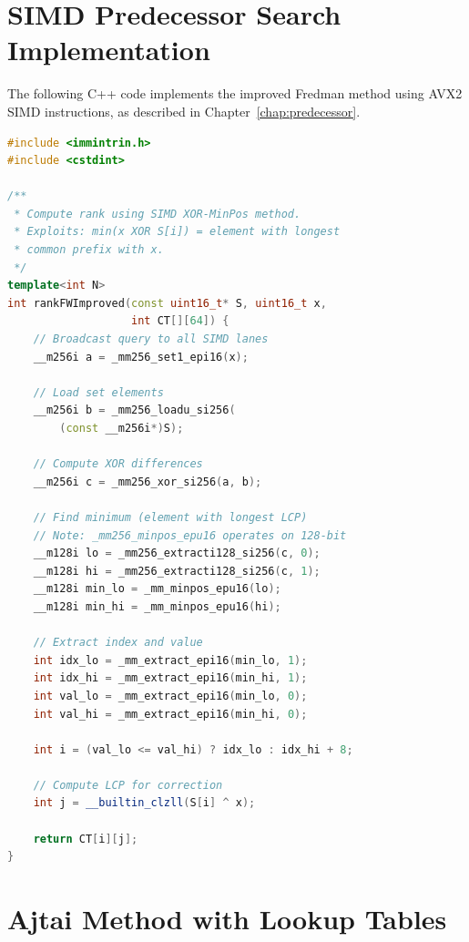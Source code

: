 \section{SIMD Predecessor Search Implementation}
\label{sec:simd-code}

The following C++ code implements the improved Fredman method using AVX2 SIMD instructions, as described in Chapter~\ref{chap:predecessor}.

\begin{lstlisting}[language=C++, caption={Improved Fredman rank using XOR-MinPos}, label={lst:fredman}]
#include <immintrin.h>
#include <cstdint>

/**
 * Compute rank using SIMD XOR-MinPos method.
 * Exploits: min(x XOR S[i]) = element with longest
 * common prefix with x.
 */
template<int N>
int rankFWImproved(const uint16_t* S, uint16_t x,
                   int CT[][64]) {
    // Broadcast query to all SIMD lanes
    __m256i a = _mm256_set1_epi16(x);

    // Load set elements
    __m256i b = _mm256_loadu_si256(
        (const __m256i*)S);

    // Compute XOR differences
    __m256i c = _mm256_xor_si256(a, b);

    // Find minimum (element with longest LCP)
    // Note: _mm256_minpos_epu16 operates on 128-bit
    __m128i lo = _mm256_extracti128_si256(c, 0);
    __m128i hi = _mm256_extracti128_si256(c, 1);
    __m128i min_lo = _mm_minpos_epu16(lo);
    __m128i min_hi = _mm_minpos_epu16(hi);

    // Extract index and value
    int idx_lo = _mm_extract_epi16(min_lo, 1);
    int idx_hi = _mm_extract_epi16(min_hi, 1);
    int val_lo = _mm_extract_epi16(min_lo, 0);
    int val_hi = _mm_extract_epi16(min_hi, 0);

    int i = (val_lo <= val_hi) ? idx_lo : idx_hi + 8;

    // Compute LCP for correction
    int j = __builtin_clzll(S[i] ^ x);

    return CT[i][j];
}
\end{lstlisting}

\section{Ajtai Method with Lookup Tables}
\label{sec:ajtai-code}

